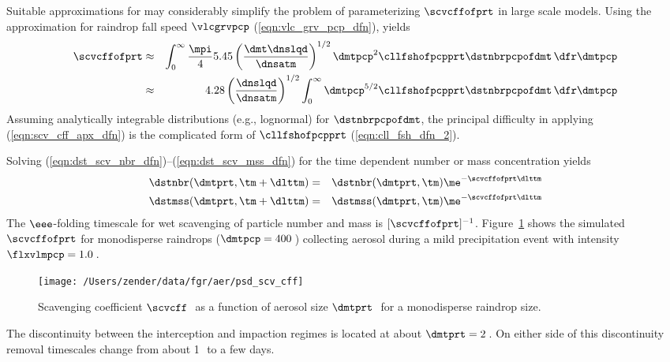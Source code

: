 \documentclass[12pt,twoside]{book}
\begin{document}
Suitable approximations for  may considerably simplify
the problem of parameterizing $\scvcffofprt$ in large scale models.
Using the approximation for raindrop fall speed $\vlcgrvpcp$
(\ref{eqn:vlc_grv_pcp_dfn}), yields
\begin{eqnarray}
\scvcffofprt 
& \approx &
\int_{0}^{\infty} \frac{\mpi}{4} 
5.45 \left( \frac{\dmt \dnslqd}{\dnsatm } \right)^{1/2}
\dmtpcp^{2} \cllfshofpcpprt \dstnbrpcpofdmt \,\dfr\dmtpcp \nonumber \\
& \approx &
4.28 \left( \frac{\dnslqd}{\dnsatm } \right)^{1/2}
\int_{0}^{\infty} \dmtpcp^{5/2} \cllfshofpcpprt \dstnbrpcpofdmt \,\dfr\dmtpcp
\label{eqn:scv_cff_apx_dfn}
\end{eqnarray}
Assuming analytically integrable distributions (e.g., lognormal) for 
$\dstnbrpcpofdmt$, the principal difficulty in applying
(\ref{eqn:scv_cff_apx_dfn}) is the complicated form of
$\cllfshofpcpprt$ (\ref{eqn:cll_fsh_dfn_2}).

Solving (\ref{eqn:dst_scv_nbr_dfn})--(\ref{eqn:dst_scv_mss_dfn})
for the time dependent number or mass concentration yields
\begin{eqnarray}
\label{eqn:nbr_tm_sln}
\dstnbr( \dmtprt , \tm + \dlttm ) & = & 
\dstnbr( \dmtprt , \tm ) \me^{- \scvcffofprt \dlttm} \\
\label{eqn:mss_tm_sln}
\dstmss( \dmtprt , \tm + \dlttm ) & = & 
\dstmss( \dmtprt , \tm ) \me^{- \scvcffofprt \dlttm}
\end{eqnarray}
The $\eee$-folding timescale for wet scavenging of particle number and
mass is $[\scvcffofprt]^{-1}$.
Figure~\ref{fgr:scv_cff} shows the simulated $\scvcffofprt$ for
monodisperse raindrops ($\dmtpcp = 400$\,\um) collecting aerosol
during a mild precipitation event with intensity 
$\flxvlmpcp = 1.0$\,\mmxhr.
\begin{figure*}
\begin{center}
\texttt{[image: /Users/zender/data/fgr/aer/psd\_scv\_cff]}\vfill
\end{center}
\caption[Scavenging coefficient]{
Scavenging coefficient $\scvcff$\,\xs\ as a function of aerosol size  
$\dmtprt$\,\um\ for a monodisperse raindrop size.
\label{fgr:scv_cff}}
\end{figure*}
The discontinuity between the interception and impaction regimes is 
located at about $\dmtprt = 2$\,\um.
On either side of this discontinuity removal timescales change from
about 1\,\hr\ to a few days.
\end{document}
